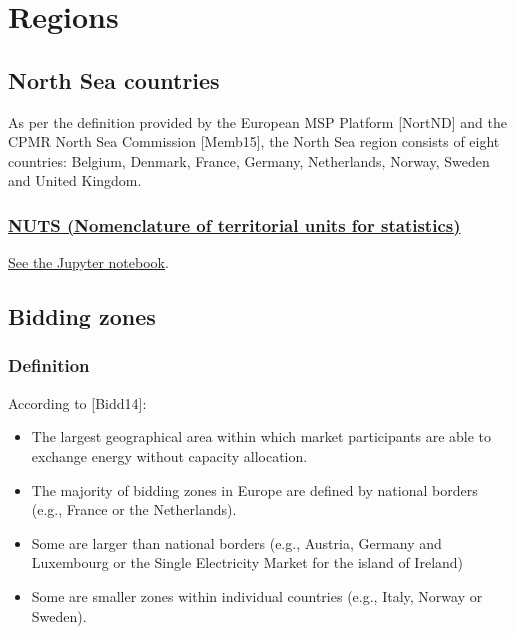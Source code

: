 \hypertarget{regions}{%
\section{Regions}\label{regions}}

\hypertarget{north-sea-countries}{%
\subsection{North Sea countries}\label{north-sea-countries}}

As per the definition provided by the European MSP Platform {[}NortND{]}
and the CPMR North Sea Commission {[}Memb15{]}, the North Sea region
consists of eight countries: Belgium, Denmark, France, Germany,
Netherlands, Norway, Sweden and United Kingdom.

\hypertarget{nuts-nomenclature-of-territorial-units-for-statistics}{%
\subsubsection{\texorpdfstring{\href{https://ec.europa.eu/eurostat/web/nuts/background}{NUTS
(Nomenclature of territorial units for
statistics)}}{NUTS (Nomenclature of territorial units for statistics)}}\label{nuts-nomenclature-of-territorial-units-for-statistics}}

\href{https://github.com/ENSYSTRA/short-term-forecasting/tree/master/jupyter-notebooks/NUTS.ipynb}{See
the Jupyter notebook}.

\hypertarget{bidding-zones}{%
\subsection{Bidding zones}\label{bidding-zones}}

\hypertarget{definition}{%
\subsubsection{Definition}\label{definition}}

According to {[}Bidd14{]}:

\begin{itemize}
\tightlist
\item
  The largest geographical area within which market participants are
  able to exchange energy without capacity allocation.
\item
  The majority of bidding zones in Europe are defined by national
  borders (e.g., France or the Netherlands).
\item
  Some are larger than national borders (e.g., Austria, Germany and
  Luxembourg or the Single Electricity Market for the island of Ireland)
\item
  Some are smaller zones within individual countries (e.g., Italy,
  Norway or Sweden).
\end{itemize}


